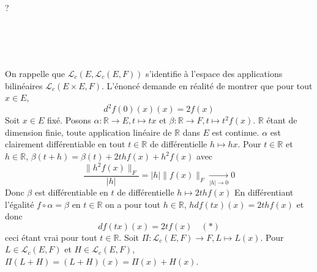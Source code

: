 \documentclass{report}
\begin{document}
\subsection{} \noindent{}\\ 
\\ 
\\
\noindent ?


 \subsection{} \noindent{}\\ 
\\ 
\\
\noindent On rappelle que $\mathcal L_c(E,\mathcal L_c(E,F))$ s'identifie à l'espace des applications bilinéaires $\mathcal L_c(E\times E, F)$.\newline
L'énoncé demande en réalité de montrer que pour tout $x\in E$, $$d^2f(0)(x)(x)=2f(x)$$
Soit $x\in E$ fixé. \newline 
Posons $\alpha:\mathbb R\to E, t\mapsto tx$ et $\beta: \mathbb R\to F, t\mapsto t^2f(x)$. $\mathbb R$ étant de dimension finie, toute application linéaire de $\mathbb R$ dans $E$ est continue. $\alpha$ est clairement différentiable en tout $t\in \mathbb R$ de différentielle $h\mapsto hx$.\newline 
Pour $t\in \mathbb R$ et $h\in \mathbb R$, $\beta(t+h)=\beta(t)+2thf(x)+h^2f(x)$ avec $$\frac{\|h^2f(x)\|_F}{|h|}=|h|\|f(x)\|_F \xrightarrow[|h|\to 0]{}0 $$
Donc $\beta$ est différentiable en $t$ de différentielle $h\mapsto 2thf(x) $ \newline \newline
En différentiant l'égalité $f\circ \alpha =\beta $ en $t\in \mathbb R$ on a pour tout $h\in \mathbb R$, $hdf(tx)(x)=2thf(x)$ et donc $$df(tx)(x)=2tf(x) \quad (*)$$
ceci étant vrai pour tout $t\in \mathbb R$.\newline 
Soit $\Pi:\mathcal L_c(E,F)\to F, L\mapsto L(x)$. Pour $L\in \mathcal L_c(E,F)$ et $H\in \mathcal L_c(E,F)$, $\Pi(L+H)=(L+H)(x)=\Pi(x)+H(x)$.\newline
\end{document}
